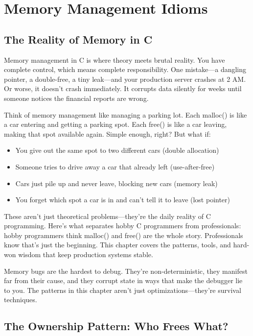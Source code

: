 \chapter{Memory Management Idioms}

\section{The Reality of Memory in C}

Memory management in C is where theory meets brutal reality. You have complete control, which means complete responsibility. One mistake—a dangling pointer, a double-free, a tiny leak—and your production server crashes at 2 AM. Or worse, it doesn't crash immediately. It corrupts data silently for weeks until someone notices the financial reports are wrong.

Think of memory management like managing a parking lot. Each malloc() is like a car entering and getting a parking spot. Each free() is like a car leaving, making that spot available again. Simple enough, right? But what if:
\begin{itemize}
    \item You give out the same spot to two different cars (double allocation)
    \item Someone tries to drive away a car that already left (use-after-free)
    \item Cars just pile up and never leave, blocking new cars (memory leak)
    \item You forget which spot a car is in and can't tell it to leave (lost pointer)
\end{itemize}

These aren't just theoretical problems—they're the daily reality of C programming. Here's what separates hobby C programmers from professionals: hobby programmers think malloc() and free() are the whole story. Professionals know that's just the beginning. This chapter covers the patterns, tools, and hard-won wisdom that keep production systems stable.

\begin{warningbox}
Memory bugs are the hardest to debug. They're non-deterministic, they manifest far from their cause, and they corrupt state in ways that make the debugger lie to you. The patterns in this chapter aren't just optimizations—they're survival techniques.
\end{warningbox}

\section{The Ownership Pattern: Who Frees What?}

